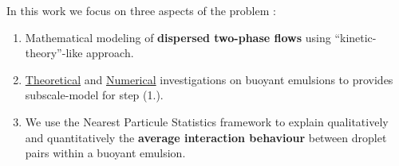 \documentclass{sintefbeamer}
\begin{document}
\begin{frame}
  {In this work we focus on three aspects of the problem :}
  \Large
  \begin{enumerate}
    \item<1-3> Mathematical modeling of \textbf{dispersed two-phase flows} using ``kinetic-theory''-like approach. 
      \item<4-6,8> \underline{Theoretical} and \underline{Numerical} investigations on buoyant emulsions to provides subscale-model for step (\textcolor{sintefblue}{1.}). 
    \item<7>{We use the Nearest Particule Statistics framework to explain qualitatively and quantitatively the \textbf{average interaction behaviour} between droplet pairs within a buoyant emulsion. }
  \end{enumerate}
\end{frame}


\end{document}
